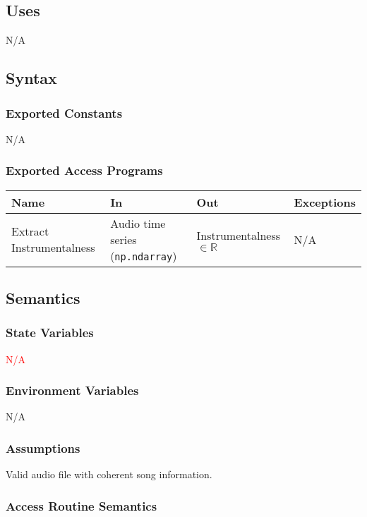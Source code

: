 \documentclass[12pt, titlepage]{article}
\begin{document}
\subsection{Uses}
N/A

\subsection{Syntax}

\subsubsection{Exported Constants}
N/A

\subsubsection{Exported Access Programs}

\begin{center}
\begin{tabular}{p{2cm} p{4cm} p{4cm} p{2cm}}
\hline
\textbf{Name} & \textbf{In} & \textbf{Out} & \textbf{Exceptions}\\
\hline%
Extract Instrumentalness &Audio time series (\texttt{np.ndarray}) &Instrumentalness $\in \mathbb{R}$ &N/A\\
\hline
\end{tabular}
\end{center}

\subsection{Semantics}

\subsubsection{State Variables}
\textcolor{red}{N/A}

\subsubsection{Environment Variables}
N/A

\subsubsection{Assumptions}
Valid audio file with coherent song information.

\subsubsection{Access Routine Semantics}
\end{document}

